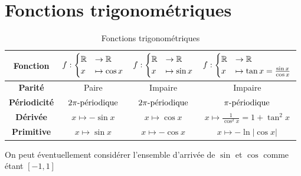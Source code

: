 \section{Fonctions trigonométriques}
\begin{table}[h!]
	\centering
	\begin{tabular}{c c c c}
		\textbf{Fonction}
		& $f :\begin{cases}
			\mathbb{R} &\to \mathbb{R} \\    
			x &\mapsto \cos{x}
		\end{cases}$
		& $f :\begin{cases}
			\mathbb{R} &\to \mathbb{R} \\    
			x &\mapsto \sin{x}
		\end{cases}$
		& $f :\begin{cases}
			\mathbb{R} &\to \mathbb{R} \\    
			x &\mapsto \tan{x} = \frac{\sin{x}}{\cos{x}}
		\end{cases}$
		\\
		\hline
		\textbf{Parité} & Paire & Impaire & Impaire \\
		\textbf{Périodicité} & $2\pi\textnormal{-périodique}$ & $2\pi\textnormal{-périodique}$ & $\pi\textnormal{-périodique}$ \\
		\textbf{Dérivée} & $x \mapsto -\sin{x}$ & $x \mapsto \cos{x}$ & $x \mapsto \frac{1}{\cos^2{x}} = 1 + \tan^2{x}$ \\
		\textbf{Primitive} & $x \mapsto \sin{x}$ & $x\mapsto -\cos{x}$ & $x \mapsto - \ln{|\cos{x}|}$ \\
		\hline
	\end{tabular}
	\caption{Fonctions trigonométriques}
\end{table}


\begin{remarque}
	\par On peut éventuellement considérer l'ensemble d'arrivée de $\sin$ et $\cos$ comme étant $[-1,1]$
\end{remarque}


